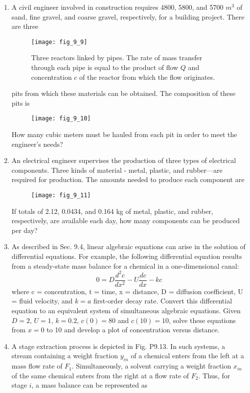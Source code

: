 \documentclass[../main.tex]{subfiles}
\begin{document}
\begin{multicols}{2}
\begin{enumerate}
	\item A civil engineer involved in construction requires 4800, 5800, and 5700 $m^{3}$ of sand, fine gravel, and coarse gravel, respectively, for a building project. There are three
	\begin{figure}[H]
		\centering
		\texttt{[image: fig\_9\_9]}
		\caption{\textsf{Three reactors linked by pipes. The rate of mass transfer through each pipe is equal to the product of flow \textbf{$Q$} and concentration $c$ of the reactor from which the flow originates.}}
		\label{fig:fig_9_9}
	\end{figure}
	pits from which these materials can be obtained. The composition of these pits is
	\begin{figure}[H]
		\centering
		\texttt{[image: fig\_9\_10]}
	\end{figure}
	How many cubic meters must be hauled from each pit in order to meet the engineer’s needs?
	\item An electrical engineer supervises the production of three types of electrical components. Three kinds of material - metal, plastic, and rubber—are required for production. The amounts needed to produce each component are
	\begin{figure}[H]
		\centering
		\texttt{[image: fig\_9\_11]}
	\end{figure}
	If totals of 2.12, 0.0434, and 0.164 kg of metal, plastic, and rubber, respectively, are available each day, how many components can be produced per day?
	\item As described in Sec. 9.4, linear algebraic equations can arise in the solution of differential equations. For example, the following differential equation results from a steady-state mass balance for a chemical in a one-dimensional canal:
	$$0=D\frac{d^{2}c}{dx^{2}}-U\frac{dc}{dx}-kc$$
	where c = concentration, t = time, x = distance, D = diffusion coefficient, U = fluid velocity, and $k=a$ first-order decay rate. Convert this differential equation to an equivalent system of simultaneous algebraic equations. Given $D=2$, $U=1$, $k=0.2$, $c(0)=80$ and $c(10)=10$, solve these equations from $x=0$ to 10 and develop a plot of concentration versus distance.
	\item A stage extraction process is depicted in Fig. P9.13. In such systems, a stream containing a weight fraction $y_{in}$ of a chemical enters from the left at a mass flow rate of $F_{1}$. Simultaneously, a solvent carrying a weight fraction $x_{in}$ of the same chemical enters from the right at a flow rate of $F_{2}$. Thus, for stage $i$, a mass balance can be represented as

\end{enumerate}
\end{multicols}
\end{document}
